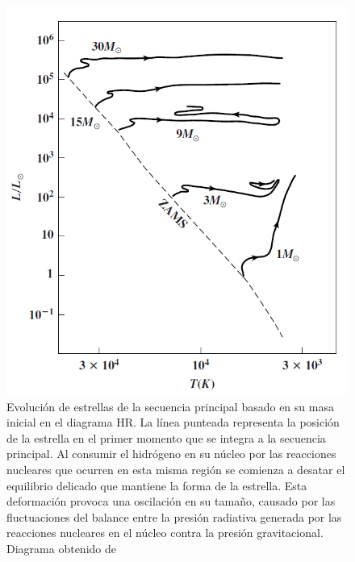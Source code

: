 \begin{figure}[!ht]
	\centering
	\includegraphics[scale=0.43]{Introduccion/Figures/Figura Evolucion_MS_Astronomy_Physical_Perspective.png}
	\caption{Evolución de estrellas de la secuencia principal basado en su masa
	inicial en el diagrama HR. La línea punteada representa la posición de la
	estrella en el primer momento que se integra a la secuencia principal. Al
	consumir el hidrógeno en su núcleo por las reacciones nucleares que ocurren
	en esta misma región se comienza a desatar el equilibrio delicado que
	mantiene la forma de la estrella. Esta deformación provoca una oscilación en
	su tamaño, causado por las fluctuaciones del balance entre la presión
	radiativa generada por las reacciones nucleares en el núcleo contra la
	presión gravitacional. Diagrama obtenido de
	}
	\label{evolucionMSEstrella}
\end{figure}